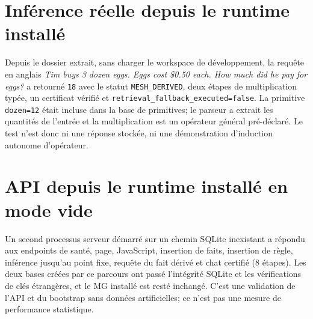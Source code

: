 \documentclass[11pt,a4paper]{book}
\begin{document}
\section{Inférence réelle depuis le runtime installé}
Depuis le dossier extrait, sans charger le workspace de développement, la requête en anglais \textit{Tim buys 3 dozen eggs. Eggs cost \$0.50 each. How much did he pay for eggs?} a retourné \texttt{18} avec le statut \texttt{MESH\_DERIVED}, deux étapes de multiplication typée, un certificat vérifié et \texttt{retrieval\_fallback\_executed=false}. La primitive \texttt{dozen=12} était incluse dans la base de primitives; le parseur a extrait les quantités de l'entrée et la multiplication est un opérateur général pré-déclaré. Le test n'est donc ni une réponse stockée, ni une démonstration d'induction autonome d'opérateur.

\section{API depuis le runtime installé en mode vide}
Un second processus serveur démarré sur un chemin SQLite inexistant a répondu aux endpoints de santé, page, JavaScript, insertion de faits, insertion de règle, inférence jusqu'au point fixe, requête du fait dérivé et chat certifié (8 étapes). Les deux bases créées par ce parcours ont passé l'intégrité SQLite et les vérifications de clés étrangères, et le MG installé est resté inchangé. C'est une validation de l'API et du bootstrap sans données artificielles; ce n'est pas une mesure de performance statistique.
\end{document}

